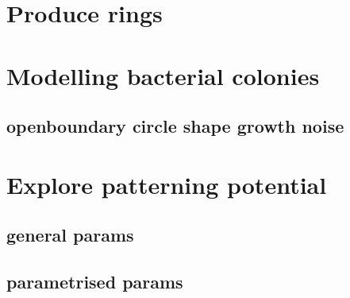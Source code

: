 

\section{Produce rings}
\section{Modelling bacterial colonies}
\subsection{openboundary circle shape growth noise}
\section{Explore patterning potential}
\subsection{general params}
\subsection{parametrised params}
